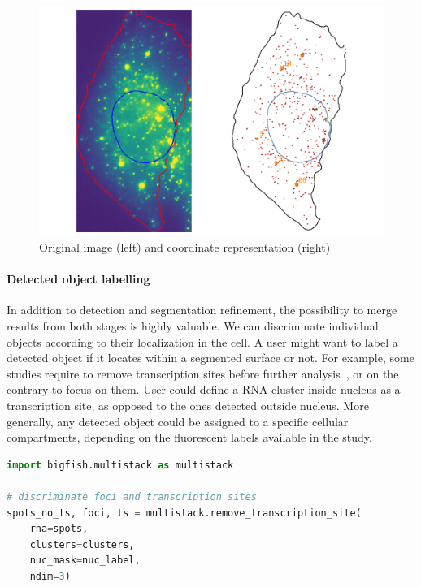 \begin{figure}[h]
    \centering
    \includegraphics[width=1\textwidth]{figures/chapter4/cell_extracted_0}
    \caption{Original image (left) and coordinate representation (right)}
    \label{fig:cell_extracted_0}
\end{figure}

\paragraph{Detected object labelling}

In addition to detection and segmentation refinement, the possibility to merge results from both stages is highly valuable.
We can discriminate individual objects according to their localization in the cell.
A user might want to label a detected object if it locates within a segmented surface or not.
For example, some studies require to remove transcription sites before further analysis~\cite{CHOUAIB_2020}, or on the contrary to focus on them.
User could define a \ac{RNA} cluster inside nucleus as a transcription site, as opposed to the ones detected outside nucleus.
More generally, any detected object could be assigned to a specific cellular compartments, depending on the fluorescent labels available in the study.\\


\begin{minipage}{0.9\textwidth}
\begin{lstlisting}[language=Python]
import bigfish.multistack as multistack

# discriminate foci and transcription sites
spots_no_ts, foci, ts = multistack.remove_transcription_site(
	rna=spots,
	clusters=clusters,
	nuc_mask=nuc_label,
	ndim=3)
\end{lstlisting}
\end{minipage}

